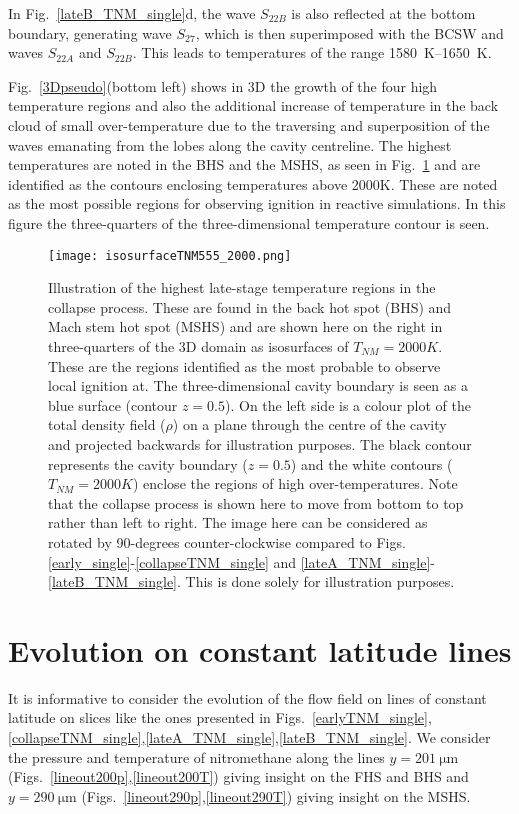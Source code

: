 \documentclass[3p,times,twocolumn]{elsarticle}
\begin{document}
In Fig.\ \ref{lateB_TNM_single}d, the wave $S_{22B}$ is also reflected
at  the bottom boundary, generating wave $S_{27}$, which is then superimposed
with the BCSW and waves $S_{22A}$ and $S_{22B}$. This leads to temperatures
of the range  \SI{1580}{\kelvin}--\SI{1650}{\kelvin}.


Fig.\ \ref{3Dpseudo}(bottom left) shows in 3D the growth of the four high temperature regions and also the additional increase of temperature in the back cloud of small over-temperature due to the traversing and superposition of the waves emanating from the lobes along the cavity centreline. The highest temperatures are noted in the BHS and the MSHS, as seen in Fig.\ \ref{3Dpseudoextra} and are identified as the contours enclosing temperatures above 2000K. These are noted as the most possible regions for observing ignition in reactive simulations. In this figure the three-quarters of the three-dimensional temperature contour is seen.


\begin{figure}[!t]
\centering
\texttt{[image: isosurfaceTNM555\_2000.png]}     
\caption{Illustration of the highest late-stage temperature regions in the collapse process. These are found in the back hot spot (BHS) and Mach stem hot spot (MSHS) and are shown here on the right in three-quarters of the 3D domain as isosurfaces of $T_{NM}=2000K$. These are the regions identified as the most probable to observe local ignition at.  The three-dimensional cavity boundary is seen as a blue surface (contour $z=0.5$). On the left side is a colour plot of the total density field ($\rho$) on a plane through the centre of the cavity and projected backwards for illustration purposes. The black contour represents the cavity boundary ($z=0.5$) and the white contours ($T_{NM}=2000K$) enclose the regions of high over-temperatures. Note that the collapse process is shown here to move from bottom to top rather than left to right. The image here can be considered as rotated by 90-degrees counter-clockwise compared to Figs. \ref{early_single}-\ref{collapseTNM_single} and \ref{lateA_TNM_single}-\ref{lateB_TNM_single}. This is done solely for illustration purposes. }
\label{3Dpseudoextra}
\end{figure}

\section{Evolution on constant latitude lines}

It is informative to consider the evolution of the flow field on lines of constant latitude on slices like the ones presented in Figs.\ \ref{earlyTNM_single},\ref{collapseTNM_single},\ref{lateA_TNM_single},\ref{lateB_TNM_single}. We consider the pressure and temperature of nitromethane along the lines $y=\SI{201}{\micro \meter}$ (Figs.\ \ref{lineout200p},\ref{lineout200T}) giving insight on the FHS and BHS and $y=\SI{290}{\micro \meter}$  (Figs.\ \ref{lineout290p},\ref{lineout290T}) giving insight on the MSHS. 
\end{document}
